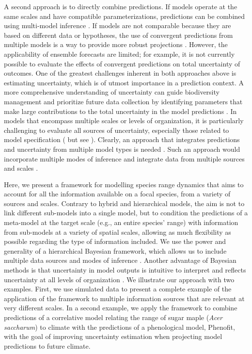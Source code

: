 A second approach is to directly combine predictions.
If models operate at the same scales and have compatible parameterizations, predictions can be combined using multi-model inference \citep[e.g., model averaging, ensemble forecasting;][]{Araujo2007, Diniz-Filho2009}. 
If models are not comparable because they are based on different data or hypotheses, the use of convergent predictions from multiple models is a way to provide more robust projections \citep{Morin2009, Marmion2009, Serra-Diaz2013}.
However, the applicability of ensemble forecasts are limited; for example, it is not currently possible to evaluate the effects of convergent predictions on total uncertainty of outcomes.
One of the greatest challenges inherent in both approaches above is estimating uncertainty, which is of utmost importance in a prediction context.
A more comprehensive understanding of uncertainty can guide biodiversity management and prioritize future data collection by identifying parameters that make large contributions to the total uncertainty in the model predictions \citep{McMahon2011}. 
In models that encompass multiple scales or levels of organization, it is particularly challenging to evaluate all sources of uncertainty, especially those related to model specification (\citealt{Calder2003} but see \citealt{Conlisk2013}).
Clearly, an approach that integrates predictions and uncertainty from multiple model types is needed \citep{Beck2012, Thuiller2013}. 
Such an approach would incorporate multiple modes of inference and integrate data from multiple sources and scales \citep{Levin1992, Peters2004, Thuiller2013}.

Here, we present a framework for modelling species range dynamics that aims to account for all the information available on a focal species, from a variety of sources and scales.
Contrary to hybrid and hierarchical models, the aim is not to link different sub-models into a single model, but to condition the predictions of a meta-model at the target scale (e.g., an entire species' range) with information from sub-models at a variety of spatial scales, allowing as much flexibility as possible regarding the type of information included. 
We use the power and generality of a hierarchical Bayesian framework, which allows us to include multiple data sources and modes of inference \citep{Clark2005, VanOijen2005, Clark2006, Hobbs2011, Hartig2012}. 
Another advantage of Bayesian methods is that uncertainty in model outputs is intuitive to interpret and reflects uncertainty at all levels of organization \citep{Clark2005, Cressie2009, Hobbs2011}. 
We illustrate our approach with two examples.
First, we use simulated data to present a complete example of the application of the framework to multiple information sources that are relevant at very different scales.
In a second example, we apply the framework to combine predictions of a correlative model relating the range of sugar maple (\emph{Acer saccharum}) to climate with the predictions of a phenological model, Phenofit, with the goal of improving uncertainty estimation when projecting model predictions to future climate.
